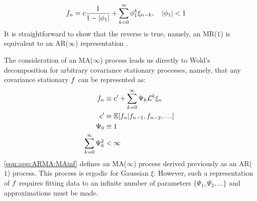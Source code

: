 \begin{align}
f_n &= c \frac{1}{1 - |\phi_1|}  +  \sum_{k=0}^{\infty} \phi_1^k \xi_{n-k}, \quad |\phi_1| < 1
\end{align}
It is straightforward to show that the reverse is true, namely, an MR($1$) is equivalent to an AR($\infty$) representation \cite{hamilton1994time}.

The consideration of an MA($\infty$) process leads us directly to Wold's decomposition for arbitrary covariance stationary processes, namely, that any covariance stationary $f$ can be represented as:
\begin{align}
f_n & \equiv  c' + \sum_{k=0}^{\infty} \Psi_k \mathcal{L}^k \xi_{n}  \label{eqn:app:ARMA:MAinf} \\
c' & \equiv \mathbb{E}[f_n | f_{n-1}, f_{n-2}, \hdots] \\
\Psi_0 & \equiv 1 \\
\sum_{k=0}^{\infty} \Psi_k^2 & < \infty
\end{align}
\cref{eqn:app:ARMA:MAinf} defines an MA($\infty$) process derived previously as an AR($1$) process. This process is ergodic for Gaussian $\xi$. However, such a representation of $f$ requires fitting data to an infinite number of parameters $\{\Psi_1, \Psi_2, \hdots \}$  and approximations must be made. 


